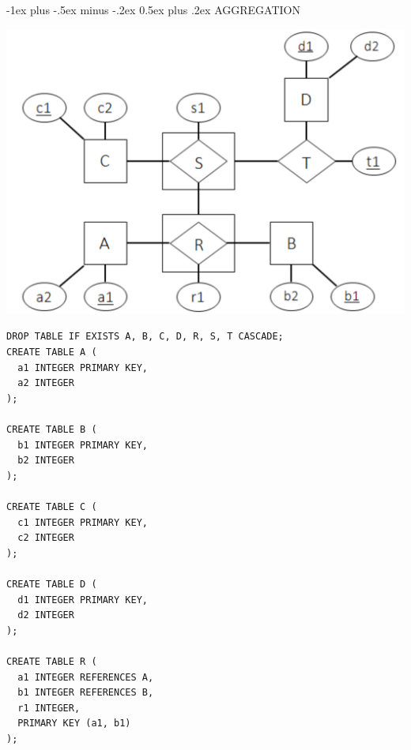 \documentclass[10pt, landscape]{article}
\makeatletter
\renewcommand{\section}{\@startsection{section}{1}{0mm}%
  {-1ex plus -.5ex minus -.2ex}%
  {0.5ex plus .2ex}%
{\normalfont\large\bfseries}}
\makeatother
\begin{document}
\raggedright
\footnotesize
\begin{center}
\end{center}

\begin{multicols*}{3}

  \setlength{\columnseprule}{0.25pt}
  \setlength{\premulticols}{1pt}
  \setlength{\postmulticols}{1pt}
  \setlength{\multicolsep}{1pt}
  \setlength{\columnsep}{2pt}

  \section{AGGREGATION}
  \begin{tightcenter}
    \includegraphics[width=0.80\linewidth]{cs2102-er-model-aggregation.png} 
  \end{tightcenter}
  \begin{lstlisting}[style=mySQL]
DROP TABLE IF EXISTS A, B, C, D, R, S, T CASCADE;
CREATE TABLE A (
  a1 INTEGER PRIMARY KEY,
  a2 INTEGER
);

CREATE TABLE B (
  b1 INTEGER PRIMARY KEY,
  b2 INTEGER
);

CREATE TABLE C (
  c1 INTEGER PRIMARY KEY,
  c2 INTEGER
);

CREATE TABLE D (
  d1 INTEGER PRIMARY KEY,
  d2 INTEGER 
);

CREATE TABLE R (
  a1 INTEGER REFERENCES A, 
  b1 INTEGER REFERENCES B,
  r1 INTEGER,
  PRIMARY KEY (a1, b1) 
);


\end{lstlisting}
\end{multicols*}
\end{document}
